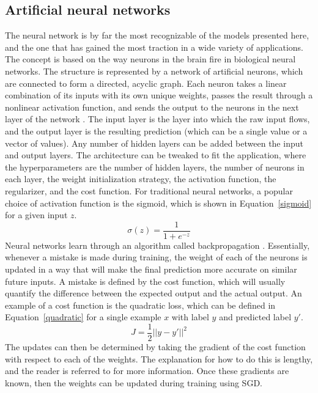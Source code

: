 \subsection{Artificial neural networks}
The neural network is by far the most recognizable of the models presented here, and the one that has gained the most traction in a wide variety of applications.  The concept is based on the way neurons in the brain fire in biological neural networks.  The structure is represented by a network of artificial neurons, which are connected to form a directed, acyclic graph.  Each neuron takes a linear combination of its inputs with its own unique weights, passes the result through a nonlinear activation function, and sends the output to the neurons in the next layer of the network \cite{schmidhuber2014}.  The input layer is the layer into which the raw input flows, and the output layer is the resulting prediction (which can be a single value or a vector of values).  Any number of hidden layers can be added between the input and output layers.  The architecture can be tweaked to fit the application, where the hyperparameters are the number of hidden layers, the number of neurons in each layer, the weight initialization strategy, the activation function, the regularizer, and the cost function.  For traditional neural networks, a popular choice of activation function is the sigmoid, which is shown in Equation~\ref{sigmoid} for a given input $z$.
%
\begin{equation}
\sigma(z) = \frac{1}{1 + e^{-z}}
\label{sigmoid}
\end{equation}
%
Neural networks learn through an algorithm called backpropagation \cite{rumelhart1986}.  Essentially, whenever a mistake is made during training, the weight of each of the neurons is updated in a way that will make the final prediction more accurate on similar future inputs.  A mistake is defined by the cost function, which will usually quantify the difference between the expected output and the actual output.  An example of a cost function is the quadratic loss, which can be defined in Equation~\ref{quadratic} for a single example $x$ with label $y$ and predicted label $y'$.
%
\begin{equation}
J = \frac{1}{2} || y - y' ||^2
\label{quadratic}
\end{equation}
%
The updates can then be determined by taking the gradient of the cost function with respect to each of the weights.  The explanation for how to do this is lengthy, and the reader is referred to \cite{rumelhart1986} for more information.  Once these gradients are known, then the weights can be updated during training using SGD.

